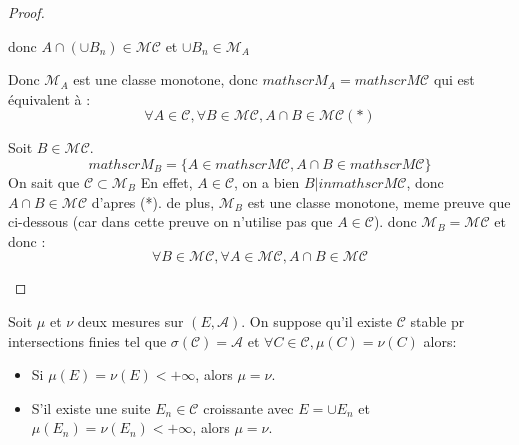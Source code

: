 \begin{proof}
\begin{itemize}
\begin{itemize}
\begin{itemize}
				                  donc $A \cap (\cup B_n) \in \mathscr{M}\mathscr{C}$ et $\cup B_n \in \mathscr{M}_A $
			            \end{itemize}

			            Donc $\mathscr{M}_A$ est une classe monotone, donc $mathscr{M}_A = mathscr{M}\mathscr{C}$ qui est équivalent à :
			            $$ \forall A \in \mathscr{C}, \forall B \in \mathscr{M}\mathscr{C}, A \cap B \in \mathscr{M}\mathscr{C} (*)$$

			            Soit $B\in \mathscr{M}\mathscr{C}$.
			            $$ mathscr{M}_B = \{ A \in mathscr{M}\mathscr{C}, A \cap B \in mathscr{M}\mathscr{C}\} $$
			            On sait que $\mathscr{C}\subset\mathscr{M}_B$
			            En effet, $A \in \mathscr{C}$, on a bien $B |in mathscr{M}\mathscr{C}$, donc $A\cap B \in\mathscr{M}\mathscr{C}$ d'apres (*).
			            de plus, $\mathscr{M}_B$ est une classe monotone, meme preuve que ci-dessous (car dans cette preuve on n'utilise pas que $A \in \mathscr{C}$).
			            donc $\mathscr{M}_B = \mathscr{M}\mathscr{C}$ et donc :
			            $$ \forall B \in \mathscr{M}\mathscr{C}, \forall A \in \mathscr{M}\mathscr{C}, A \cap B \in \mathscr{M}\mathscr{C}$$
		      \end{itemize}
	\end{itemize}
\end{proof}


\begin{theorem}
	Soit $\mu$ et $\nu$ deux mesures sur $(E,\mathscr{A})$. On suppose qu'il existe
	$\mathscr{C}$ stable pr intersections finies tel que $\sigma(\mathscr{C}) = \mathscr{A}$
	et $\forall C \in \mathscr{C}, \mu(C) = \nu(C)$ alors:
	\begin{itemize}
		\item Si $\mu(E) = \nu (E) < +\infty$, alors $\mu = \nu$.
		\item S'il existe une suite $E_n\in \mathscr{C}$ croissante avec
		      $E = \cup E_n$ et $\mu(E_n) = \nu(E_n)< +\infty$, alors $\mu = \nu$.
	\end{itemize}
\end{theorem}

